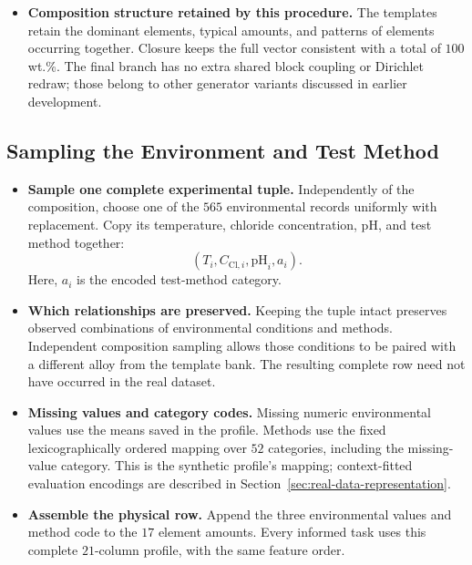 \documentclass[11pt]{article}
\newenvironment{notes}
  {\begin{itemize}\setlength{\itemsep}{0.45em}\setlength{\parsep}{0pt}}
  {\end{itemize}}
\begin{document}
\begin{notes}
    \item \textbf{Composition structure retained by this procedure.}
    The templates retain the dominant elements, typical amounts,
    and patterns of elements occurring together. Closure keeps
    the full vector consistent with a total of \(100\) wt.\%.
    The final branch has no extra shared block coupling or
    Dirichlet redraw; those belong to other generator variants
    discussed in earlier development.
\end{notes}

\subsection{Sampling the Environment and Test Method}
\label{sec:environment-generator}

\begin{notes}
    \item \textbf{Sample one complete experimental tuple.}
    Independently of the composition, choose one of the
    \(565\) environmental records uniformly with replacement.
    Copy its temperature, chloride concentration, pH, and
    test method together:
    \[
        (T_i,C_{\mathrm{Cl},i},\mathrm{pH}_i,a_i).
    \]
    Here, \(a_i\) is the encoded test-method category.

    \item \textbf{Which relationships are preserved.}
    Keeping the tuple intact preserves observed combinations
    of environmental conditions and methods. Independent
    composition sampling allows those conditions to be paired
    with a different alloy from the template bank.
    The resulting complete row need not have occurred in the
    real dataset.

    \item \textbf{Missing values and category codes.}
    Missing numeric environmental values use the means saved
    in the profile. Methods use the fixed lexicographically
    ordered mapping over \(52\) categories, including the
    missing-value category. This is the synthetic profile's
    mapping; context-fitted evaluation encodings are described
    in Section~\ref{sec:real-data-representation}.

    \item \textbf{Assemble the physical row.}
    Append the three environmental values and method code to
    the \(17\) element amounts. Every informed task uses this
    complete \(21\)-column profile, with the same feature order.
\end{notes}
\end{document}
